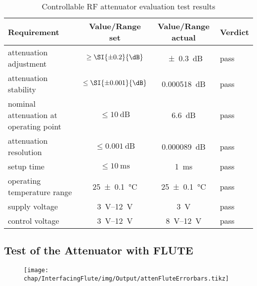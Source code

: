\begin{table}[tbh]
\caption{Controllable RF attenuator evaluation test results}
\label{tab:interfacingFlute_rfattenrequirements_result}
\centering
\begin{tabular}{lccl}
	\toprule
	Requirement                            &      {Value/Range} set      &  {Value/Range} actual   & Verdict \\ \midrule
	attenuation adjustment                 &    $\ge\SI{\pm0.2}{\dB}$    &    \SI{\pm0.3}{\dB}     & pass    \\
	attenuation stability                  &   $\le\SI{\pm0.001}{\dB}$   &   \SI{0.000518}{\dB}    & pass    \\
	nominal attenuation at operating point &      $\le\SI{10}{\dB}$      &      \SI{6.6}{\dB}      & pass    \\
	attenuation resolution                 &    $\le\SI{0.001}{\dB}$     &   \SI{0.000089}{\dB}    & pass    \\
	setup time                             & $\le\SI{10}{\milli\second}$ &       \SI{1}{\ms}       & pass    \\
	operating temperature range            &   \SI{25\pm0.1}{\celsius}   & \SI{25\pm0.1}{\celsius} & pass    \\
	supply voltage                         &   \SIrange{3}{12}{\volt}    &      \SI{3}{\volt}      & pass    \\
	control voltage                        &   \SIrange{3}{12}{\volt}    & \SIrange{8}{12}{\volt}  & pass    \\ \bottomrule
\end{tabular}
\end{table}

\subsection{Test of the Attenuator with FLUTE}


\begin{figure}[tb]
	\centering
	\texttt{[image: chap/InterfacingFlute/img/Output/attenFluteErrorbars.tikz]}
	\caption{}
	\label{fig:aaaa}
\end{figure}



